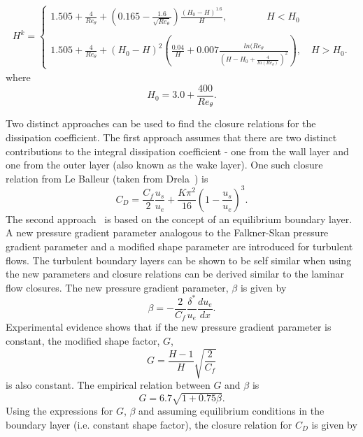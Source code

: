 \begin{align}
H^k = \begin{cases}
1.505 + \frac{4}{Re_{\theta}}+\left(0.165 - \frac{1.6}{\sqrt{Re_{\theta}}}\right)\frac{(H_0 -H)^{1.6}}{H}, \qquad \qquad H < H_0 \\ \\
1.505 + \frac{4}{Re_{\theta}} + (H_0 - H)^2\left(\frac{0.04}{H}+0.007\frac{ln(Re_{\theta}}{(H-H_0+\frac{4}{ln(Re_{\theta})})^2}\right), \quad H > H_0.
\end{cases}
\end{align}
where 
\begin{equation*}
H_0 = 3.0 + \frac{400}{Re_{\theta}}.
\end{equation*}

Two distinct approaches can be used to find the closure relations for the dissipation coefficient. The first approach assumes that there are two distinct contributions to the integral dissipation coefficient - one from the wall layer and one from the outer layer (also known as the wake layer). One such closure relation from Le Balleur (taken from Drela~\cite{drelaphdthesis}) is
\begin{equation}
C_D = \frac{C_f}{2}\frac{u_s}{u_e} + \frac{K\pi^2}{16}\left(1-\frac{u_s}{u_e}\right)^3.
\end{equation}
The second approach~\cite{drelaphdthesis} is based on the concept of an equilibrium boundary layer. A new pressure gradient parameter analogous to the  Falkner-Skan pressure gradient parameter and a modified shape parameter are introduced for turbulent flows. The turbulent boundary layers can be shown to be self similar when using the new parameters and closure relations can be derived similar to the laminar flow closures. The new pressure gradient parameter, $\beta$ is given by
\begin{equation}
\beta = -\frac{2}{C_f}\frac{\delta^{\ast}}{u_e}\frac{du_e}{dx}.
\end{equation}
Experimental evidence shows that if the new pressure gradient parameter is constant, the modified shape factor, $G$,
\begin{equation}
G=\frac{H-1}{H}\sqrt{\frac{2}{C_f}}
\end{equation}
is also constant. The empirical relation between $G$ and $\beta$ is~\cite{drelaphdthesis}
\begin{equation}
G = 6.7\sqrt{1+0.75\beta}.
\end{equation}
Using the expressions for $G$, $\beta$ and assuming equilibrium conditions in the boundary layer (i.e. constant shape factor), the closure relation for $C_D$ is given by
